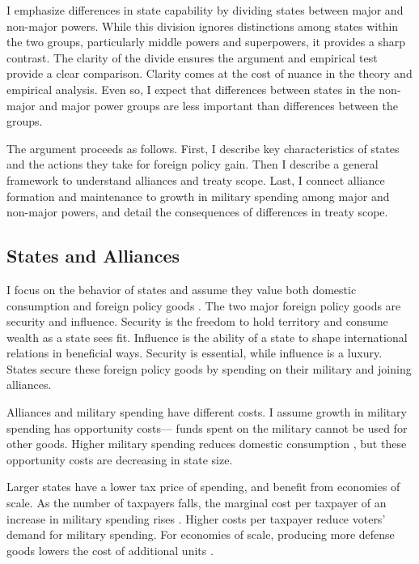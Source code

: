 \documentclass[12pt]{article}
\begin{document}
I emphasize differences in state capability by dividing states between major and non-major powers. 
While this division ignores distinctions among states within the two groups, particularly middle powers and superpowers, it provides a sharp contrast.
The clarity of the divide ensures the argument and empirical test provide a clear comparison. 
Clarity comes at the cost of nuance in the theory and empirical analysis. 
Even so, I expect that differences between states in the non-major and major power groups are less important than differences between the groups. 


The argument proceeds as follows.
First, I describe key characteristics of states and the actions they take for foreign policy gain. 
Then I describe a general framework to understand alliances and treaty scope. 
Last, I connect alliance formation and maintenance to growth in military spending among major and non-major powers, and detail the consequences of differences in treaty scope.  



\subsection{States and Alliances}


I focus on the behavior of states and assume they value both domestic consumption and foreign policy goods \citep{Powell1993, Fearon2018}. 
The two major foreign policy goods are security and influence. 
Security is the freedom to hold territory and consume wealth as a state sees fit. 
Influence is the ability of a state to shape international relations in beneficial ways. 
Security is essential, while influence is a luxury. 
States secure these foreign policy goods by spending on their military and joining alliances. 


Alliances and military spending have different costs. 
I assume growth in military spending has opportunity costs--- funds spent on the military cannot be used for other goods. 
Higher military spending reduces domestic consumption \citep{Fearon2018}, but these opportunity costs are decreasing in state size. 


Larger states have a lower tax price of spending, and benefit from economies of scale. 
As the number of taxpayers falls, the marginal cost per taxpayer of an increase in military spending rises \citep{DudleyMontmarquette1981}. 
Higher costs per taxpayer reduce voters' demand for military spending. 
For economies of scale, producing more defense goods lowers the cost of additional units \citep{Moravcsik1991, AlesinaSpolaore2006}. 
\end{document}
